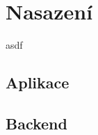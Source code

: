 \chapter{Nasazení}

\begin{chapterabstract}
	asdf
\end{chapterabstract}

\section{Aplikace}

\section{Backend}